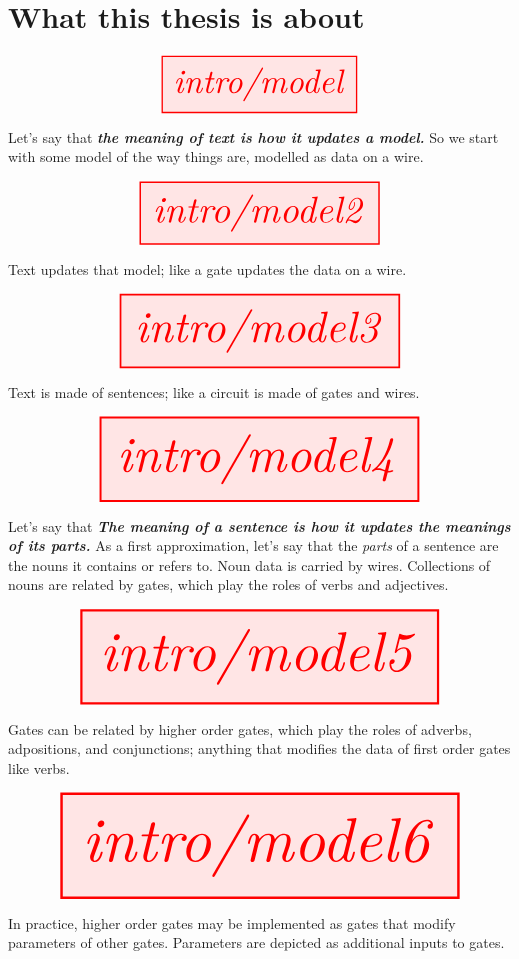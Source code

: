 \section{What this thesis is about}

\begin{marginfigure}
\centering
\[\resizebox{0.5\textwidth}{!}{\tikzfig{intro/model}}\]
\caption{Let's say that \textbf\emph{{the meaning of text is how it updates a model.}} So we start with some model of the way things are, modelled as data on a wire.}
\end{marginfigure}

\begin{marginfigure}
\centering
\[\resizebox{0.6\textwidth}{!}{\tikzfig{intro/model2}}\]
\caption{Text updates that model; like a gate updates the data on a wire.}
\end{marginfigure}

\begin{marginfigure}
\centering
\[\resizebox{0.7\textwidth}{!}{\tikzfig{intro/model3}}\]
\caption{Text is made of sentences; like a circuit is made of gates and wires.}
\end{marginfigure}

\begin{marginfigure}
\centering
\[\resizebox{0.8\textwidth}{!}{\tikzfig{intro/model4}}\]
\caption{Let's say that \textbf{\emph{The meaning of a sentence is how it updates the meanings of its parts.}} As a first approximation, let's say that the \emph{parts} of a sentence are the nouns it contains or refers to. Noun data is carried by wires. Collections of nouns are related by gates, which play the roles of verbs and adjectives.}
\end{marginfigure}

\begin{marginfigure}
\centering
\[\resizebox{0.9\textwidth}{!}{\tikzfig{intro/model5}}\]
\caption{Gates can be related by higher order gates, which play the roles of adverbs, adpositions, and conjunctions; anything that modifies the data of first order gates like verbs.}
\end{marginfigure}

\begin{marginfigure}
\centering
\[\resizebox{\textwidth}{!}{\tikzfig{intro/model6}}\]
\caption{In practice, higher order gates may be implemented as gates that modify parameters of other gates. Parameters are depicted as additional inputs to gates.}
\end{marginfigure}

